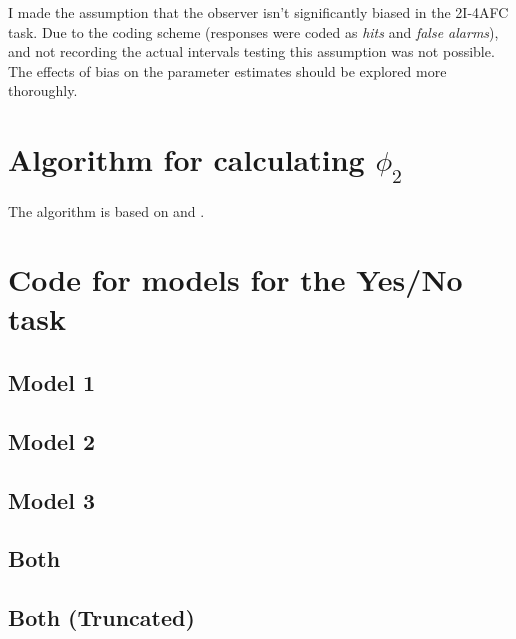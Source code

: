 \documentclass{article}\usepackage{knitr}
\begin{document}
I made the assumption that the observer isn't significantly biased in the 2I-4AFC task. Due to the coding scheme (responses were coded as \textit{hits} and \textit{false alarms}), and not recording the actual intervals testing this assumption was not possible. The effects of bias on the parameter estimates should be explored more thoroughly.

\clearpage



\newpage


\appendix
{}

\section{Algorithm for calculating \texorpdfstring{$\phi_2$}{bivariate CDF}}

The algorithm is based on \citet{boys1989} and \citet{pan2017}.



\newpage
\section{Code for models for the Yes/No task}

\subsection{Model 1}


\subsection{Model 2}


\subsection{Model 3}


\subsection{Both}


\subsection{Both (Truncated)}

\end{document}
